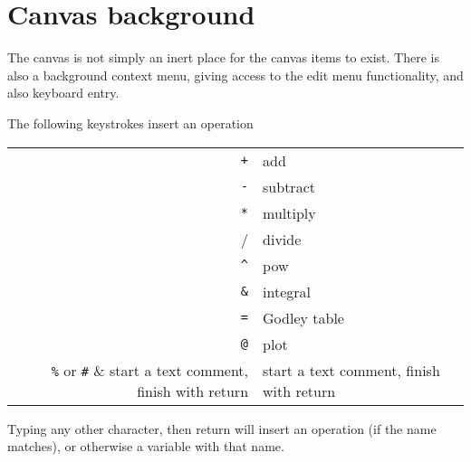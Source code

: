 \section{Canvas background}

The canvas is not simply an inert place for the canvas items to
exist. There is also a background context menu, giving access to the
edit menu functionality, and also keyboard entry.

The following keystrokes insert an operation

\begin{tabular}{rl}
\verb-+- & add\\
\verb+-+ & subtract \\
\verb+*+ & multiply\\
\verb++/ & divide\\
\verb+^+ & pow\\
\verb+&+ & integral\\
\verb+=+ & Godley table\\
\verb+@+ & plot\\
\verb+%+ or \verb+#+ & start a text comment, finish with return\\
\end{tabular}

Typing any other character, then return will insert an operation (if
the name matches), or otherwise a variable with that name.
